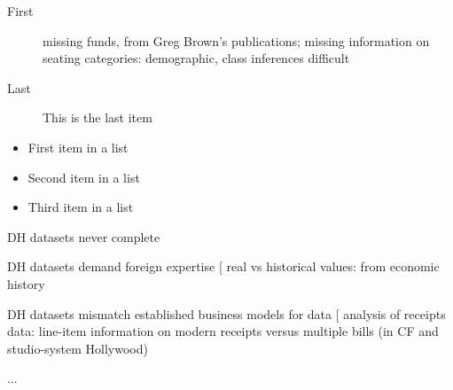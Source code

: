 \documentclass[	DIV=calc,%
							paper=a4,%
							fontsize=11pt,%
							twocolumn]{scrartcl}	 					%
\begin{document}
\begin{description}
	\item[First] missing funds, from Greg Brown’s publications; missing information on seating categories: demographic, class inferences difficult
	\item[Last] This is the last item
\end{description}

\begin{itemize}
	\item First item in a list
	\item Second item in a list
	\item Third item in a list
\end{itemize}

DH datasets never complete

DH datasets demand foreign expertise
  [ real vs historical values: from economic history

DH datasets mismatch established business models for data
  [ analysis of receipts data: line-item information on modern receipts versus multiple bills (in CF and studio-system Hollywood)

...

\printbibliography
\end{document}
